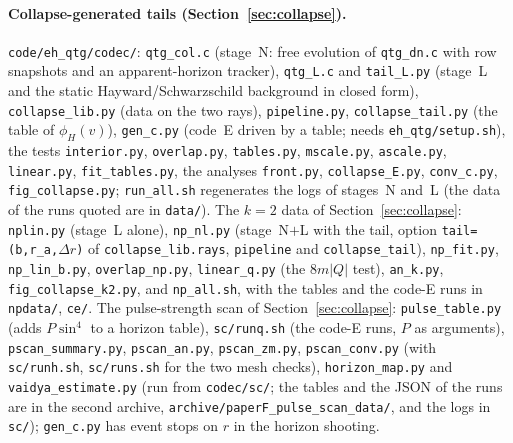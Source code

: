 \documentclass[11pt]{article}
\begin{document}
\paragraph{Collapse-generated tails (Section~\ref{sec:collapse}).} \texttt{code/eh\_qtg/codec/}: \texttt{qtg\_col.c} (stage~N: free evolution of \texttt{qtg\_dn.c} with row snapshots and an apparent-horizon tracker), \texttt{qtg\_L.c} and \texttt{tail\_L.py} (stage~L and the static Hayward/Schwarzschild background in closed form), \texttt{collapse\_lib.py} (data on the two rays), \texttt{pipeline.py}, \texttt{collapse\_tail.py} (the table of $\phi_H(v)$), \texttt{gen\_c.py} (code~E driven by a table; needs \texttt{eh\_qtg/setup.sh}), the tests \texttt{interior.py}, \texttt{overlap.py}, \texttt{tables.py}, \texttt{mscale.py}, \texttt{ascale.py}, \texttt{linear.py}, \texttt{fit\_tables.py}, the analyses \texttt{front.py}, \texttt{collapse\_E.py}, \texttt{conv\_c.py}, \texttt{fig\_collapse.py}; \texttt{run\_all.sh} regenerates the logs of stages~N and~L (the data of the runs quoted are in \texttt{data/}). The $k=2$ data of Section~\ref{sec:collapse}: \texttt{nplin.py} (stage~L alone), \texttt{np\_nl.py} (stage~N$+$L with the tail, option \texttt{tail=(b,r\_a,$\Delta r$)} of \texttt{collapse\_lib.rays}, \texttt{pipeline} and \texttt{collapse\_tail}), \texttt{np\_fit.py}, \texttt{np\_lin\_b.py}, \texttt{overlap\_np.py}, \texttt{linear\_q.py} (the $8m|Q|$ test), \texttt{an\_k.py}, \texttt{fig\_collapse\_k2.py}, and \texttt{np\_all.sh}, with the tables and the code-E runs in \texttt{npdata/}, \texttt{ce/}. The pulse-strength scan of Section~\ref{sec:collapse}: \texttt{pulse\_table.py} (adds $P\sin^{4}$ to a horizon table), \texttt{sc/runq.sh} (the code-E runs, $P$ as arguments), \texttt{pscan\_summary.py}, \texttt{pscan\_an.py}, \texttt{pscan\_zm.py}, \texttt{pscan\_conv.py} (with \texttt{sc/runh.sh}, \texttt{sc/runs.sh} for the two mesh checks), \texttt{horizon\_map.py} and \texttt{vaidya\_estimate.py} (run from \texttt{codec/sc/}; the tables and the JSON of the runs are in the second archive, \texttt{archive/paperF\_pulse\_scan\_data/}, and the logs in \texttt{sc/}); \texttt{gen\_c.py} has event stops on $r$ in the horizon shooting.



\end{document}

